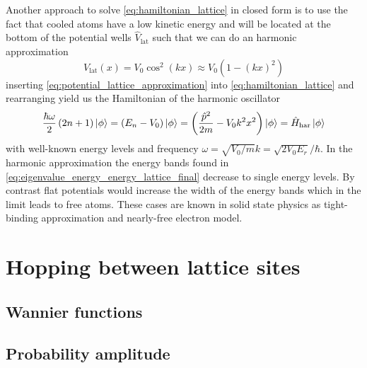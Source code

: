 Another approach to solve \cref{eq:hamiltonian_lattice} in closed form is to
use the fact that cooled atoms have a low kinetic energy and will be located
at the bottom of the potential wells $\hat{V}_\text{lat}$ such that we can
do an harmonic approximation
\begin{equation}
  V_\text{lat}(x)
  =V_0\cos^2(kx)
  \approx V_0\left(1-(kx)^2\right)
  \label{eq:potential_lattice_approximation}
\end{equation}
inserting \cref{eq:potential_lattice_approximation} into
\cref{eq:hamiltonian_lattice} and rearranging yield us the Hamiltonian of
the harmonic oscillator
\begin{equation}
  \frac{\hbar\omega}{2}\left(2n+1\right)\ket{\phi}
  =\left(E_n-V_0\right)\ket{\phi}
  =\left(\frac{\hat{p}^2}{2m}-V_0k^2x^2\right)\ket{\phi}
  =\hat{H}_\text{har}\ket{\phi}
\end{equation}
with well-known energy levels and frequency
$\omega=\sqrt{V_0/m}k=\sqrt{2V_0E_r}/\hbar$. In the harmonic approximation
the energy bands found in \cref{eq:eigenvalue_energy_energy_lattice_final}
decrease to single energy levels. By contrast flat potentials would increase
the width of the energy bands which in the limit leads to free atoms. These
cases are known in solid state physics as tight-binding approximation and
nearly-free electron model.

\section{Hopping between lattice sites}

\subsection{Wannier functions}

\subsection{Probability amplitude}
